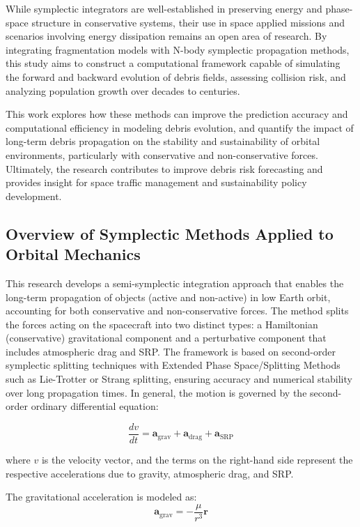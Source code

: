 \documentclass[letterpaper, preprint, paper,11pt]{AAS}	%
\begin{document}
While symplectic integrators are well-established in preserving energy and phase-space structure in conservative systems, their use in space applied missions and scenarios involving energy dissipation remains an open area of research. By integrating fragmentation models with N-body symplectic propagation methods, this study aims to construct a computational framework capable of simulating the forward and backward evolution of debris fields, assessing collision risk, and analyzing population growth over decades to centuries.

This work explores how these methods can improve the prediction accuracy and computational efficiency in modeling debris evolution, and quantify the impact of long-term debris propagation on the stability and sustainability of orbital environments, particularly with conservative and non-conservative forces. Ultimately, the research contributes to improve debris risk forecasting and provides insight for space traffic management and sustainability policy development.

\subsection{Overview of Symplectic Methods Applied to Orbital Mechanics}

This research develops a semi-symplectic integration approach that enables the long-term propagation of objects (active and non-active) in low Earth orbit, accounting for both conservative and non-conservative forces. The method splits the forces acting on the spacecraft into two distinct types: a Hamiltonian (conservative) gravitational component and a perturbative component that includes atmospheric drag and SRP. The framework is based on second-order symplectic splitting techniques with Extended Phase Space/Splitting Methods such as Lie-Trotter or Strang splitting, ensuring accuracy and numerical stability over long propagation times\cite{luo_applying_2017}. In general, the motion is governed by the second-order ordinary differential equation:

\begin{equation}
    \frac{dv}{dt} = \bm{a}_{\text{grav}} + \bm{a}_{\text{drag}} + \bm{a}_{\text{SRP}}
\end{equation}

where $v$ is the velocity vector, and the terms on the right-hand side represent the respective accelerations due to gravity, atmospheric drag, and SRP.

The gravitational acceleration is modeled as:
\begin{equation}
    \bm{a}_{\text{grav}} = -\frac{\mu}{r^3} \bm{r}
\end{equation}
\end{document}
